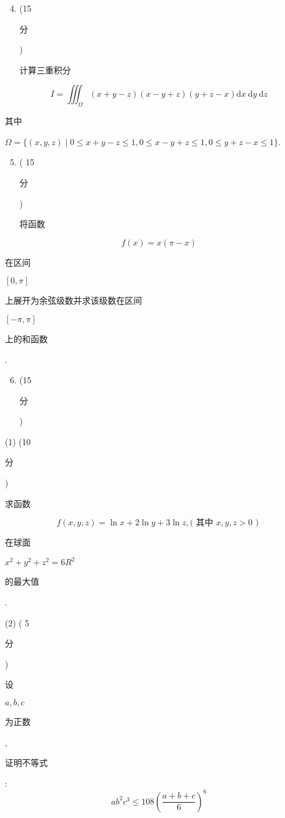 \documentclass[10pt]{article}
\begin{document}
\begin{enumerate}
  \setcounter{enumi}{3}
  \item (15 \begin{CJK}{UTF8}{mj}分\end{CJK}) \begin{CJK}{UTF8}{mj}计算三重积分\end{CJK}
\end{enumerate}
$$
I=\iiint_{\Omega}(x+y-z)(x-y+z)(y+z-x) \mathrm{d} x \mathrm{~d} y \mathrm{~d} z
$$
\begin{CJK}{UTF8}{mj}其中\end{CJK} $\Omega=\{(x, y, z) \mid 0 \leq x+y-z \leq 1,0 \leq x-y+z \leq 1,0 \leq y+z-x \leq 1\}$.

\begin{enumerate}
  \setcounter{enumi}{4}
  \item ( 15 \begin{CJK}{UTF8}{mj}分\end{CJK}) \begin{CJK}{UTF8}{mj}将函数\end{CJK}
\end{enumerate}
$$
f(x)=x(\pi-x)
$$
\begin{CJK}{UTF8}{mj}在区间\end{CJK} $[0, \pi]$ \begin{CJK}{UTF8}{mj}上展开为余弦级数并求该级数在区间\end{CJK} $[-\pi, \pi]$ \begin{CJK}{UTF8}{mj}上的和函数\end{CJK}.

\begin{enumerate}
  \setcounter{enumi}{5}
  \item (15 \begin{CJK}{UTF8}{mj}分\end{CJK})
\end{enumerate}
(1) (10 \begin{CJK}{UTF8}{mj}分\end{CJK}) \begin{CJK}{UTF8}{mj}求函数\end{CJK}
$$
f(x, y, z)=\ln x+2 \ln y+3 \ln z,(\text { 其中 } x, y, z>0 \text { ) }
$$
\begin{CJK}{UTF8}{mj}在球面\end{CJK} $x^{2}+y^{2}+z^{2}=6 R^{2}$ \begin{CJK}{UTF8}{mj}的最大值\end{CJK}.

(2) ( 5 \begin{CJK}{UTF8}{mj}分\end{CJK}) \begin{CJK}{UTF8}{mj}设\end{CJK} $a, b, c$ \begin{CJK}{UTF8}{mj}为正数\end{CJK}, \begin{CJK}{UTF8}{mj}证明不等式\end{CJK}:
$$
a b^{2} c^{3} \leq 108\left(\frac{a+b+c}{6}\right)^{6}
$$
\end{document}
